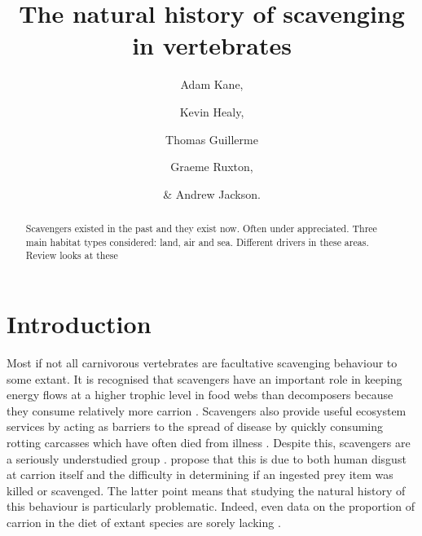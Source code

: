 \documentclass[a4paper,12pt]{article}
\title{The natural history of scavenging in vertebrates}
\author{Adam Kane, \and Kevin Healy, \and Thomas Guillerme \and Graeme Ruxton, \and \& Andrew Jackson.}
\begin{document}
\maketitle


\begin{abstract}
  Scavengers existed in the past and they exist now. 
  Often under appreciated. 
  Three main habitat types considered: land, air and sea. 
  Different drivers in these areas. 
  Review looks at these 
\end{abstract}


\newpage


\section*{Introduction}

Most if not all carnivorous vertebrates are facultative scavenging behaviour to some extant.
It is recognised that scavengers have an important role in keeping energy flows at a higher trophic level in food webs than decomposers because they consume relatively more carrion \citep{devault2003scavenging}. 
Scavengers also provide useful ecosystem services by acting as barriers to the spread of disease by quickly consuming rotting carcasses which have often died from illness \citep{ogada2012dropping}.
Despite this, scavengers are a seriously understudied group \citep{sekercioglu2006increasing,selva2007nested,wilson2011scavenging}.  
\cite{devault2003scavenging} propose that this is due to both human disgust at carrion itself and the difficulty in determining if an ingested prey item was killed or scavenged. 
The latter point means that studying the natural history of this behaviour is particularly problematic.
Indeed, even data on the proportion of carrion in the diet of extant species are sorely lacking \citep{benbow2015introduction}.
\end{document}
